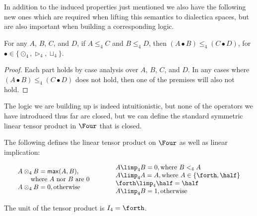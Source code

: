 In addition to the induced properties just mentioned we also have the
following new ones which are required when lifting this semantics to
dialectica spaces, but are also important when building a
corresponding logic.
\begin{lemma}[Functorality]
  \label{lemma:functorality}
  For any $A$, $B$, $C$, and $D$, if $A \leq_4 C$ and $B \le_4 D$,
  then $(A \bullet B) \leq_4 (C \bullet D)$, for $\bullet \in \{\odot_4,
  \rhd_4, \sqcup_4 \}$.
\end{lemma}
\begin{proof}
  Each part holds by case analysis over $A$, $B$, $C$,
  and $D$.  In any cases where $(A \bullet B) \leq_4 (C \bullet D)$
  does not hold, then one of the premises will also not hold.
\end{proof}
The logic we are building up is indeed intuitionistic, but none of the
operators we have introduced thus far are closed, but we can define
the standard symmetric linear tensor product in $\Four$ that is
closed.
\begin{definition}
  \label{def:tensor-and-implication}
  The following defines the linear tensor product on $\Four$ as well
  as linear implication:  
    \begin{center}
      \begin{math}
        \setlength{\arraycolsep}{10px}
        \begin{array}{lll}
          \begin{array}{lll}
            A \otimes_4 B = \mathsf{max}(A,B), \\
          \,\,\,\,\,\,\,\,\,\,\,\,\text{where $A$ nor $B$ are $0$}\\
          A \otimes_4 B = 0, \text{otherwise}
          \end{array}
          &
          \begin{array}{lll}
            A \limp_4 B = 0, \text{where $B <_4 A$}\\
            A \limp_4 A = A, \text{where $A \in \{\forth,\half\}$}\\
            \forth \limp_4 \half = \half\\
            A \limp_4 B = 1, \text{otherwise}
          \end{array}
        \end{array}
      \end{math}
    \end{center}
    The unit of the tensor product is $I_4 = \forth$.\\   
\end{definition}
